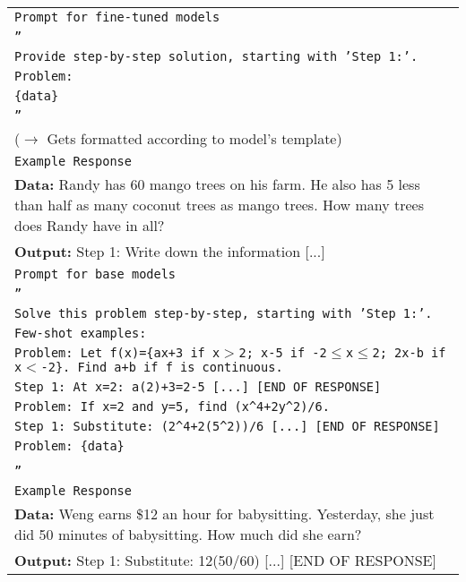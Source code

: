 \begin{longtable}{p{14.5cm}}
\rowcolor{blue!10}
\multicolumn{1}{c}{\texttt{Task 2: Reasoning Steps}} \\ \midrule

\rowcolor{gray!10}
\texttt{Prompt for fine-tuned models} \\
\texttt{''} \\
\texttt{Provide step-by-step solution, starting with 'Step 1:'.} \\
\texttt{Problem:} \\
\texttt{\{data\}} \\
\texttt{''} \\
($\rightarrow$ Gets formatted according to model's template) \\
\rowcolor{gray!10}
\texttt{Example Response} \\
\textbf{Data:} Randy has 60 mango trees on his farm. He also has 5 less than half as many coconut trees as mango trees. How many trees does Randy have in all? \\
\textbf{Output:} Step 1: Write down the information [...] \\ 
\midrule
\rowcolor{gray!10}
\texttt{Prompt for base models} \\
\texttt{''} \\
\texttt{Solve this problem step-by-step, starting with 'Step 1:'.} \\
\texttt{Few-shot examples:} \\
\texttt{Problem: Let f(x)=\{ax+3 if x$>$2; x-5 if -2$\leq$x$\leq$2; 2x-b if x$<$-2\}. Find a+b if f is continuous.} \\
\texttt{Step 1: At x=2: a(2)+3=2-5 [...] [END OF RESPONSE]} \\
\texttt{Problem: If x=2 and y=5, find (x\^{}4+2y\^{}2)/6.} \\
\texttt{Step 1: Substitute: (2\^{}4+2(5\^{}2))/6 [...] [END OF RESPONSE]} \\
\texttt{Problem: \{data\}} \\\\
\texttt{''} \\
\rowcolor{gray!10}
\texttt{Example Response} \\
\textbf{Data:} Weng earns \$12 an hour for babysitting. Yesterday, she just did 50 minutes of babysitting. How much did she earn? \\
\textbf{Output:} Step 1: Substitute: 12(50/60) [...] [END OF RESPONSE] \\
\midrule



\end{longtable}

